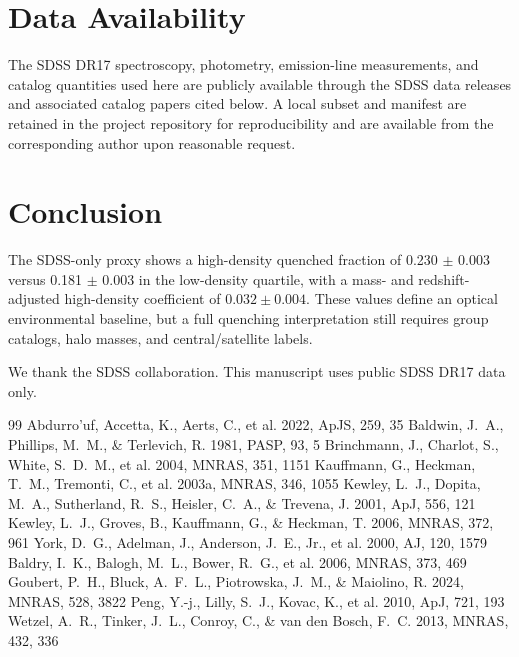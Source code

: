\documentclass[twocolumn]{aastex631}
\begin{document}
\section{Data Availability}\label{sec:data-avail}
The SDSS DR17 spectroscopy, photometry, emission-line measurements, and catalog quantities used here are publicly available through the SDSS data releases and associated catalog papers cited below. A local subset and manifest are retained in the project repository for reproducibility and are available from the corresponding author upon reasonable request.

\section{Conclusion}\label{sec:conclusion}
The SDSS-only proxy shows a high-density quenched fraction of 0.230 $\pm$ 0.003 versus 0.181 $\pm$ 0.003 in the low-density quartile, with a mass- and redshift-adjusted high-density coefficient of $0.032 \pm 0.004$. These values define an optical environmental baseline, but a full quenching interpretation still requires group catalogs, halo masses, and central/satellite labels.

\begin{acknowledgments}
We thank the SDSS collaboration. This manuscript uses public SDSS DR17 data only.
\end{acknowledgments}
\begin{thebibliography}{99}
 Abdurro'uf, Accetta, K., Aerts, C., et al. 2022, ApJS, 259, 35
 Baldwin, J.~A., Phillips, M.~M., \& Terlevich, R. 1981, PASP, 93, 5
 Brinchmann, J., Charlot, S., White, S.~D.~M., et al. 2004, MNRAS, 351, 1151
 Kauffmann, G., Heckman, T.~M., Tremonti, C., et al. 2003a, MNRAS, 346, 1055
 Kewley, L.~J., Dopita, M.~A., Sutherland, R.~S., Heisler, C.~A., \& Trevena, J. 2001, ApJ, 556, 121
 Kewley, L.~J., Groves, B., Kauffmann, G., \& Heckman, T. 2006, MNRAS, 372, 961
 York, D.~G., Adelman, J., Anderson, J.~E., Jr., et al. 2000, AJ, 120, 1579
 Baldry, I.~K., Balogh, M.~L., Bower, R.~G., et al. 2006, MNRAS, 373, 469
 Goubert, P.~H., Bluck, A.~F.~L., Piotrowska, J.~M., \& Maiolino, R. 2024, MNRAS, 528, 3822
 Peng, Y.-j., Lilly, S.~J., Kovac, K., et al. 2010, ApJ, 721, 193
 Wetzel, A.~R., Tinker, J.~L., Conroy, C., \& van den Bosch, F.~C. 2013, MNRAS, 432, 336
\end{thebibliography}
\end{document}
